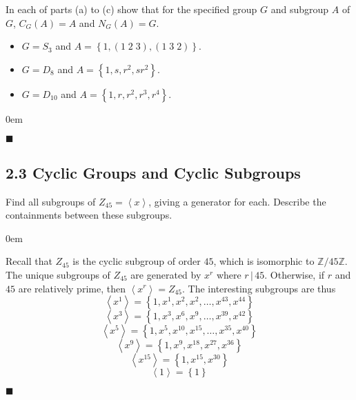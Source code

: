 \documentclass[12pt]{article}
\renewcommand{\qed}{\hfill$\blacksquare$}
\renewenvironment{proof}{\begin{addmargin}[1em]{0em}\begin{newproof}}{\end{newproof}\end{addmargin}\qed}
\newenvironment{problem}[2][Exercise]{\begin{trivlist}
\item[\hskip \labelsep {\bfseries #1}\hskip \labelsep {\bfseries #2.}]}{\end{trivlist}}
\begin{document}
\begin{problem}{2.2.5}
In each of parts (a) to (c) show that for the specified group $G$ and subgroup $A$ of $G$, $C_G\left(A\right) = A$ and $N_G\left(A\right)=G$.
\begin{itemize}
	\item $G=S_3$ and $A = \left\{1, \left(1\;2\;3\right), \left(1\;3\;2\right)\right\}$.
	\item $G=D_8$ and $A=\left\{ 1,s,r^2,sr^2\right\}$.
	\item $G=D_{10}$ and $A=\left\{1,r,r^2,r^3,r^4\right\}$.
\end{itemize}
\end{problem}
\begin{proof}

\end{proof}





















\subsection*{2.3 Cyclic Groups and Cyclic Subgroups}


\begin{problem}{2.3.1}
Find all subgroups of $Z_{45}=\left\langle x\right\rangle$, giving a generator for each. Describe the containments between these subgroups.
\end{problem}
\begin{proof}
Recall that $Z_{45}$ is the cyclic subgroup of order $45$, which is isomorphic to $\mathbb{Z}/45\mathbb{Z}$. The unique subgroups of $Z_{45}$ are generated by $x^r$ where $r\,|\, 45$. Otherwise, if $r$ and $45$ are relatively prime, then $\left\langle x^r \right\rangle = Z_{45}$. The interesting subgroups are thus
\[ \left\langle x^1 \right\rangle = \left\{1,x^1,x^2,x^2,\ldots,x^{43},x^{44}\right\} \]
\[ \left\langle x^3 \right\rangle = \left\{1,x^3,x^6,x^9,\ldots,x^{39},x^{42}\right\} \]
\[ \left\langle x^5 \right\rangle = \left\{1,x^5,x^{10},x^{15},\ldots,x^{35},x^{40}\right\} \]
\[ \left\langle x^9 \right\rangle = \left\{1,x^9,x^{18},x^{27},x^{36}\right\} \]
\[ \left\langle x^{15} \right\rangle = \left\{1,x^{15},x^{30}\right\} \]
\[ \left\langle 1 \right\rangle = \left\{1\right\} \]
\end{proof}
\end{document}
